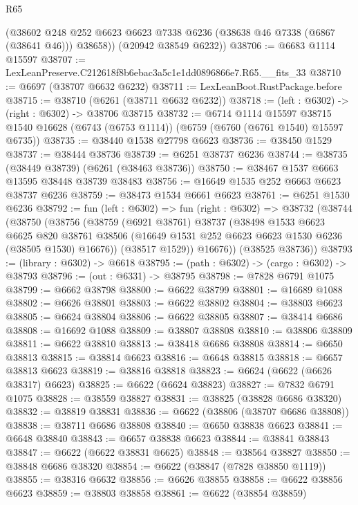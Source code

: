 \begin{lexlean}{R65}
\begin{coremodule}
{        (@38602 @248 @252 @6623 @6623 @7338 @6236 (@38638 @46 @7338 (@6867 (@38641 @46))) @38658))
      (@20942 @38549 @6232))
@38706 := @6683 @1114 @15597
@38707 := LexLeanPreserve.C212618f8b6ebac3a5c1e1dd0896866e7.R65.__fits_33
@38710 := @6697 (@38707 @6632 @6232)
@38711 := LexLeanBoot.RustPackage.before
@38715 := @38710 (@6261 (@38711 @6632 @6232))
@38718 := (left : @6302) -> (right : @6302) -> @38706 @38715
@38732 := @6714
    @1114
    @15597
    @38715
    @1540
    @16628
    (@6743 (@6753 @1114))
    (@6759 (@6760 (@6761 @1540) @15597 @6735))
@38735 := @38440 @1538 @27798 @6623
@38736 := @38450 @1529
@38737 := @38444 @38736
@38739 := @6251 @38737 @6236
@38744 := @38735 (@38449 @38739) (@6261 (@38463 @38736))
@38750 := @38467 @1537 @6663 @13595 @38448 @38739 @38483
@38756 := @16649 @1535 @252 @6663 @6623 @38737 @6236
@38759 := @38473 @1534 @6661 @6623
@38761 := @6251 @1530 @6236
@38792 := fun (left : @6302) =>
  fun (right : @6302) =>
  @38732
    (@38744
      (@38750
        (@38756
          (@38759
            (@6921 @38761)
            @38737
            (@38498
              @1533
              @6623
              @6625
              @820
              @38761
              @38506
              (@16649 @1531 @252 @6623 @6623 @1530 @6236 (@38505 @1530) @16676))
            (@38517 @1529))
          @16676))
      (@38525 @38736))
@38793 := (library : @6302) -> @6618
@38795 := (path : @6302) -> (cargo : @6302) -> @38793
@38796 := (out : @6331) -> @38795
@38798 := @7828 @6791 @1075
@38799 := @6662 @38798
@38800 := @6622 @38799
@38801 := @16689 @1088
@38802 := @6626 @38801
@38803 := @6622 @38802
@38804 := @38803 @6623
@38805 := @6624 @38804
@38806 := @6622 @38805
@38807 := @38414 @6686
@38808 := @16692 @1088
@38809 := @38807 @38808
@38810 := @38806 @38809
@38811 := @6622 @38810
@38813 := @38418 @6686 @38808
@38814 := @6650 @38813
@38815 := @38814 @6623
@38816 := @6648 @38815
@38818 := @6657 @38813 @6623
@38819 := @38816 @38818
@38823 := @6624 (@6622 (@6626 @38317) @6623)
@38825 := @6622 (@6624 @38823)
@38827 := @7832 @6791 @1075
@38828 := @38559 @38827
@38831 := @38825 (@38828 @6686 @38320)
@38832 := @38819 @38831
@38836 := @6622 (@38806 (@38707 @6686 @38808))
@38838 := @38711 @6686 @38808
@38840 := @6650 @38838 @6623
@38841 := @6648 @38840
@38843 := @6657 @38838 @6623
@38844 := @38841 @38843
@38847 := @6622 (@6622 @38831 @6625)
@38848 := @38564 @38827
@38850 := @38848 @6686 @38320
@38854 := @6622 (@38847 (@7828 @38850 @1119))
@38855 := @38316 @6632
@38856 := @6626 @38855
@38858 := @6622 @38856 @6623
@38859 := @38803 @38858
@38861 := @6622 (@38854 @38859)
}
\end{coremodule}
\end{lexlean}
